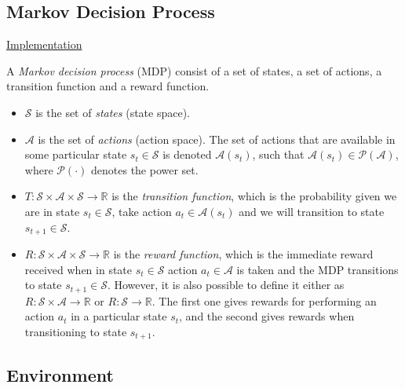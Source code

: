 \documentclass{article}
\begin{document}
\subsection{Markov Decision Process}

\noindent
\href{https://github.com/davidrobles/mlnd-capstone-code/blob/master/capstone/mdp/mdp.py}
     {Implementation}
\break

A \emph{Markov decision process} (MDP) consist of a set of states, a set of actions, a transition
function and a reward function.

\begin{itemize}

    \item $\mathcal{S}$ is the set of \emph{states} (state space).

    \item $\mathcal{A}$ is the set of \emph{actions} (action space). The set of actions that are
      available in some particular state $s_t \in \mathcal{S}$ is denoted $\mathcal{A}(s_t)$, such
      that $\mathcal{A}(s_t) \in \mathcal{P}(\mathcal{A})$, where $\mathcal{P}(\cdot)$ denotes the
      power set.

    \item $ T : \mathcal{S} \times \mathcal{A} \times \mathcal{S} \to \mathbb{R}$ is the
      \emph{transition function}, which is the probability given we are in state $s_t \in
      \mathcal{S}$, take action $a_t \in \mathcal{A}(s_t)$ and we will transition to state $s_{t+1}
      \in \mathcal{S}$.

    \item $ R : \mathcal{S} \times \mathcal{A} \times \mathcal{S} \to \mathbb{R}$ is the
      \emph{reward function}, which is the immediate reward received when in state $s_t \in
      \mathcal{S}$ action $a_t \in \mathcal{A}$ is taken and the MDP transitions to state $s_{t+1}
      \in \mathcal{S}$. However, it is also possible to define it either as $ R : \mathcal{S} \times
      \mathcal{A} \to \mathbb{R}$ or $R : \mathcal{S} \to \mathbb{R}$. The first one gives rewards
      for performing an action $a_t$ in a particular state $s_t$, and the second gives rewards when
      transitioning to state $s_{t+1}$.

\end{itemize}

\subsection{Environment}
\end{document}
